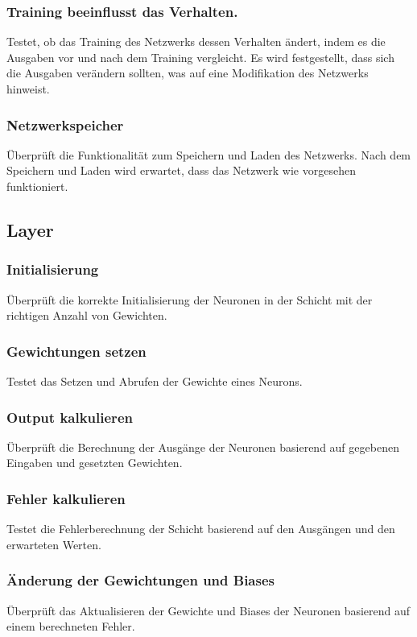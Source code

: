 \subsubsection{Training beeinflusst das Verhalten.}
\label{sec:DesignTrainingBeeinflusstDasVerhalten}
Testet, ob das Training des Netzwerks dessen Verhalten ändert, indem es die Ausgaben vor und nach dem Training vergleicht. Es wird festgestellt, dass sich die Ausgaben verändern sollten, was auf eine Modifikation des Netzwerks hinweist.
\subsubsection{Netzwerkspeicher}
\label{sec:DesignNetzwerkspeicher}
Überprüft die Funktionalität zum Speichern und Laden des Netzwerks. Nach dem Speichern und Laden wird erwartet, dass das Netzwerk wie vorgesehen funktioniert.

\subsection{Layer}
\label{sec:DesignLayer}
\subsubsection{Initialisierung}
\label{sec:DesignInitialisierung}
Überprüft die korrekte Initialisierung der Neuronen in der Schicht mit der richtigen Anzahl von Gewichten.
\subsubsection{Gewichtungen setzen}
\label{sec:DesignGewichtungenSetzen}
Testet das Setzen und Abrufen der Gewichte eines Neurons.
\subsubsection{Output kalkulieren}
\label{sec:DesignOutputKalkulieren}
Überprüft die Berechnung der Ausgänge der Neuronen basierend auf gegebenen Eingaben und gesetzten Gewichten.
\subsubsection{Fehler kalkulieren}
\label{sec:DesignFehlerKalkulieren}
Testet die Fehlerberechnung der Schicht basierend auf den Ausgängen und den erwarteten Werten.
\subsubsection{Änderung der Gewichtungen und Biases}
\label{sec:DesignÄnderungDerGewichtungenUndBiases}
Überprüft das Aktualisieren der Gewichte und Biases der Neuronen basierend auf einem berechneten Fehler.

